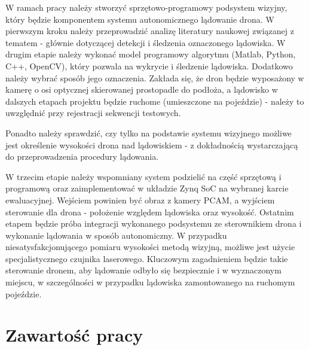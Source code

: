 W ramach pracy należy stworzyć sprzętowo-programowy podsystem wizyjny, który będzie komponentem systemu autonomicznego lądowanie drona. W pierwszym kroku należy przeprowadzić analizę literatury naukowej związanej z tematem - głównie dotyczącej detekcji i śledzenia oznaczonego lądowiska. 
W
drugim etapie należy wykonać model programowy algorytmu (Matlab, Python, C++, OpenCV), który pozwala na wykrycie i śledzenie lądowiska. Dodatkowo należy wybrać sposób jego oznaczenia. Zakłada się, że dron będzie wyposażony w kamerę o osi optycznej skierowanej prostopadle do podłoża, a lądowisko w dalszych etapach projektu będzie ruchome (umieszczone na pojeździe) - należy to uwzględnić przy rejestracji sekwencji testowych. 

Ponadto należy sprawdzić, czy tylko na podstawie systemu wizyjnego możliwe jest określenie wysokości drona nad lądowiskiem - z dokładnością wystarczającą do przeprowadzenia procedury lądowania.

W trzecim etapie należy wspomniany system podzielić na część sprzętową i programową oraz zaimplementować w układzie Zynq SoC na wybranej karcie ewaluacyjnej. Wejściem powinien być obraz z kamery PCAM, a wyjściem sterowanie dla drona - położenie względem lądowiska oraz wysokość.
Ostatnim etapem będzie próba integracji wykonanego podsystemu ze sterownikiem drona i wykonanie lądowania w sposób autonomiczny. W przypadku niesatysfakcjonującego pomiaru wysokości metodą wizyjną, możliwe jest użycie specjalistycznego czujnika laserowego. Kluczowym zagadnieniem będzie takie sterowanie dronem, aby lądowanie odbyło się bezpiecznie i w wyznaczonym miejscu, w szczególności w przypadku lądowiska zamontowanego na ruchomym pojeździe.





\section{Zawartość pracy}
\label{sec:zawartoscPracy}

